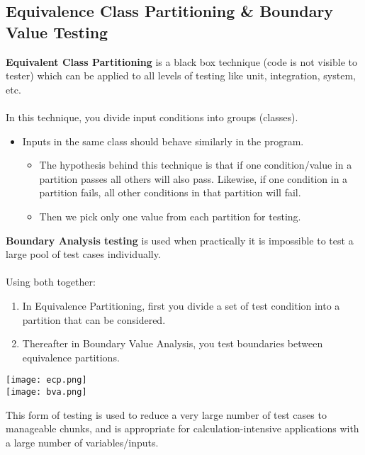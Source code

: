 \documentclass[a4paper]{article}
\begin{document}
\subsection{Equivalence Class Partitioning \& Boundary Value Testing}
\textbf{Equivalent Class Partitioning} is a black box technique (code is not visible to tester) which can be applied to all levels of testing like unit, integration, system, etc.\\
\\
In this technique, you divide input conditions into groups (classes).
\begin{itemize}
	\item Inputs in the same class should behave similarly in the program.
	\begin{itemize}[label=$\circ$]
		\item The hypothesis behind this technique is that if one condition/value in a partition passes all others will also pass. Likewise, if one condition in a partition fails, all other conditions in that partition will fail.
		\item Then we pick only one value from each partition for testing.
	\end{itemize}
\end{itemize}
\textbf{Boundary Analysis testing} is used when practically it is impossible to test a large pool of test cases individually.\\
\\
Using both together:
\begin{enumerate}
	\item In Equivalence Partitioning, first you divide a set of test condition into a partition that can be considered.
	\item Thereafter in Boundary Value Analysis, you test boundaries between equivalence partitions.
\end{enumerate}
\begin{center}
	\texttt{[image: ecp.png]}\\
	\texttt{[image: bva.png]}
\end{center}
This form of testing is used to reduce a very large number of test cases to manageable chunks, and is appropriate for calculation-intensive applications with a large number of variables/inputs.
\end{document}
